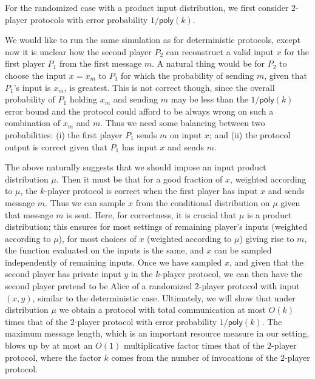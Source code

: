 \documentclass{toc}
\newcommand{\poly}{\mathsf{poly}}
\newcommand{\bigo}[1]{\ensuremath{{{O} \left( {#1} \right)}}}
\begin{document}
For the randomized case with a product input distribution, we first consider $2$-player protocols with error probability $1/\poly(k)$. 

We would like to run the same simulation as for deterministic protocols, 
except now it is unclear how the second player $P_2$ can reconstruct a valid input $x$ for the first player $P_1$ from the first message $m$. 
A natural thing would be for $P_2$
to choose the input $x=x_m$ to $P_1$ for which the probability
of sending $m$, given that $P_1$'s input is $x_m$, is greatest. 
This is not correct though, since the overall probability of $P_1$ holding $x_m$ and sending $m$ may be less than the $1/\poly(k)$ error bound  
and the protocol could afford to be always wrong on such a combination of $x_m$ and $m$.
Thus we need some balancing between two probabilities:  
%
(i) %
the first player $P_1$ sends $m$ on input $x$;
and %
(ii)  %
%
%
the protocol output is correct 
given that $P_1$ 
has input $x$ and sends $m$. 

The above naturally suggests that we should impose an
input product distribution $\mu$. Then it must be that for a good
fraction of $x$, weighted according to $\mu$,
the $k$-player protocol is correct when the first player has input $x$ and sends message $m$. 
Thus we can sample $x$ from the conditional distribution on $\mu$
given that message $m$ is sent. Here, for correctness, it is crucial
that $\mu$ is a product distribution; this ensures for most settings of
remaining player's inputs (weighted according to $\mu$), for most choices
of $x$ (weighted according to $\mu$) giving rise to $m$, the function evaluated on the inputs is the same, and $x$ can be sampled independently of remaining inputs. 
Once we have sampled $x$, and given that the second player has private input $y$ in the $k$-player protocol, we can then have
the second player pretend to be Alice of a randomized $2$-player
protocol with input $(x,y)$, similar to the deterministic case. 
Ultimately,  
we will show that under distribution $\mu$ we obtain a protocol with
total communication at most $\bigo{k}$ times that of the 
$2$-player protocol with error probability $1/\poly(k)$. The maximum message length, which is an important resource measure in our setting, blows up by at most an $\bigo{1}$ multiplicative factor times that of the $2$-player
protocol, 
where the factor $k$ comes from 
the number of invocations of the $2$-player protocol. 
\end{document}
